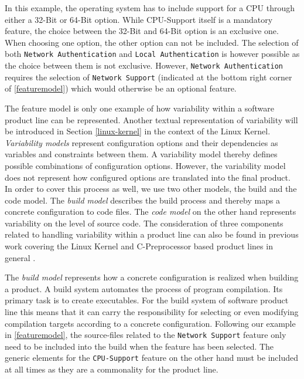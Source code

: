 \documentclass[a4paper]{article}
\begin{document}
In this example, the operating system has to include support for a CPU through either a 32-Bit or 64-Bit option. While CPU-Support itself is a mandatory feature, the choice between the 32-Bit and 64-Bit option is an exclusive one. When choosing one option, the other option can not be included. The selection of both \texttt{Network Authentication} and \texttt{Local Authentication} is however possible as the choice between them is not exclusive. However, \texttt{Network Authentication} requires the selection of \texttt{Network Support} (indicated at the bottom right corner of \autoref{featuremodel}) which would otherwise be an optional feature. 

The feature model is only one example of how variability within a software product line can be represented. Another textual representation of variability will be introduced in Section \ref{linux-kernel} in the context of the Linux Kernel. \emph{Variability models} represent configuration options and their dependencies as variables and constraints between them. A variability model thereby defines possible combinations of configuration options. However, the variability model does not represent how configured options are translated into the final product. In order to cover this process as well, we use two other models, the build and the code model. The \emph{build model} describes the build process and thereby maps a concrete configuration to code files. The \emph{code model} on the other hand represents variability on the level of source code. The consideration of three components related to handling variability within a product line can also be found in previous work covering the Linux Kernel  \cite{nadi-linux-kernel} \cite{mining-kbuild} and C-Preprocessor based product lines in general \cite{KroeherEl-SharkawySchmid18}.

The \emph{build model} represents how a concrete configuration is realized when building a product. A build system automates the process of program compilation. Its primary task is to create executables. For the build system of software product line this means that it can carry the responsibility for selecting or even modifying compilation targets according to a concrete configuration. Following our example in \autoref{featuremodel}, the source-files related to the \texttt{Network Support} feature only need to be included into the build when the feature has been selected. The generic elements for the \texttt{CPU-Support} feature on the other hand must be included at all times as they are a commonality for the product line. 
\end{document}
